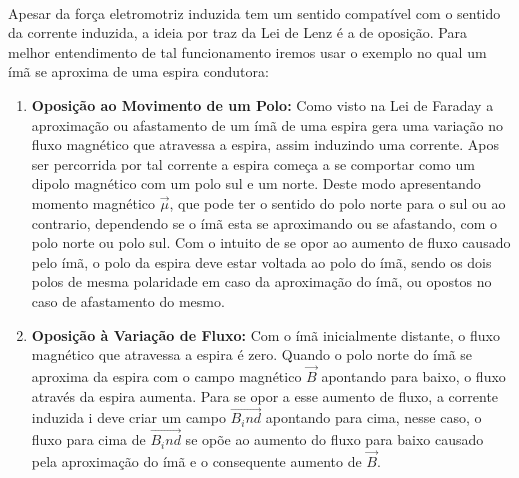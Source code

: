 \documentclass[a4paper, 12pt]{article}
\begin{document}
\paragraph{}Apesar da força eletromotriz induzida tem um sentido compatível com o sentido da corrente induzida, a ideia por traz da Lei de Lenz é a de oposição. Para melhor entendimento de tal funcionamento iremos usar o exemplo no qual um ímã se aproxima de uma espira condutora:
\begin{enumerate}
    \item \textbf{Oposição ao Movimento de um Polo:} Como visto na Lei de Faraday a aproximação ou afastamento de um ímã de uma espira gera uma variação no fluxo magnético que atravessa a espira, assim induzindo uma corrente. Apos ser percorrida por tal corrente a espira começa a se comportar como um dipolo magnético com um polo sul e um norte. Deste modo apresentando momento magnético $\overrightarrow{\mu}$, que pode ter o sentido do polo norte para o sul ou ao contrario, dependendo se o ímã esta se aproximando ou se afastando, com o polo norte ou polo sul. Com o intuito de se opor ao aumento de fluxo causado pelo ímã, o polo da espira deve estar voltada ao polo do ímã, sendo os dois polos de mesma polaridade em caso da aproximação do ímã, ou opostos no caso de afastamento do mesmo.
    \item \textbf{Oposição à Variação de Fluxo:} Com o ímã inicialmente distante, o fluxo magnético que atravessa a espira é zero. Quando o polo norte do ímã se aproxima da espira com o campo magnético $\overrightarrow{B}$ apontando para baixo, o fluxo através da espira aumenta. Para se opor a esse aumento de fluxo, a corrente induzida i deve criar um campo $\overrightarrow{B_ind}$ apontando para cima, nesse caso, o fluxo para cima de $\overrightarrow{B_ind}$ se opõe ao aumento do fluxo para baixo causado pela aproximação do ímã e o consequente aumento de $\overrightarrow{B}$.
\end{enumerate}
\end{document}

